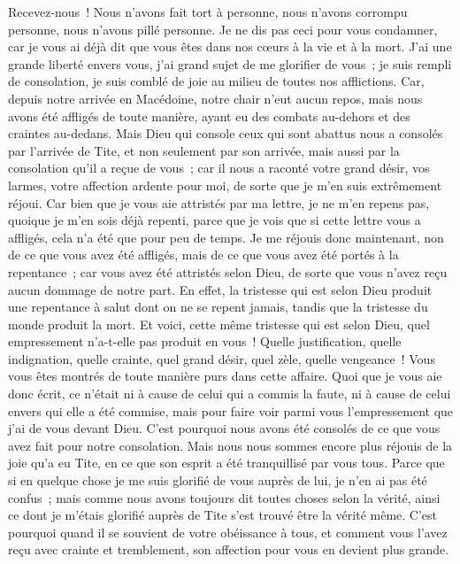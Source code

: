 \begin{multicols}{2}
Recevez-nous~! Nous n'avons fait tort à personne, nous n'avons corrompu personne, nous n'avons pillé personne.
Je ne dis pas ceci pour vous condamner, car je vous ai déjà dit que vous êtes dans nos cœurs à la vie et à la mort.
J'ai une grande liberté envers vous, j'ai grand sujet de me glorifier de vous~; je suis rempli de consolation, je suis comblé de joie au milieu de toutes nos afflictions.
Car, depuis notre arrivée en Macédoine, notre chair n'eut aucun repos, mais nous avons été affligés de toute manière, ayant eu des combats au-dehors et des craintes au-dedans.
Mais Dieu qui console ceux qui sont abattus nous a consolés par l'arrivée de Tite,
et non seulement par son arrivée, mais aussi par la consolation qu'il a reçue de vous~; car il nous a raconté votre grand désir, vos larmes, votre affection ardente pour moi, de sorte que je m'en suis extrêmement réjoui.
Car bien que je vous aie attristés par ma lettre, je ne m'en repens pas, quoique je m'en sois déjà repenti, parce que je vois que si cette lettre vous a affligés, cela n'a été que pour peu de temps.
Je me réjouis donc maintenant, non de ce que vous avez été affligés, mais de ce que vous avez été portés à la repentance~; car vous avez été attristés selon Dieu, de sorte que vous n'avez reçu aucun dommage de notre part.
En effet, la tristesse qui est selon Dieu produit une repentance à salut dont on ne se repent jamais, tandis que la tristesse du monde produit la mort.
Et voici, cette même tristesse qui est selon Dieu, quel empressement n'a-t-elle pas produit en vous~! Quelle justification, quelle indignation, quelle crainte, quel grand désir, quel zèle, quelle vengeance~! Vous vous êtes montrés de toute manière purs dans cette affaire.
Quoi que je vous aie donc écrit, ce n'était ni à cause de celui qui a commis la faute, ni à cause de celui envers qui elle a été commise, mais pour faire voir parmi vous l'empressement que j'ai de vous devant Dieu.
C'est pourquoi nous avons été consolés de ce que vous avez fait pour notre consolation. Mais nous nous sommes encore plus réjouis de la joie qu'a eu Tite, en ce que son esprit a été tranquillisé par vous tous.
Parce que si en quelque chose je me suis glorifié de vous auprès de lui, je n'en ai pas été confus~; mais comme nous avons toujours dit toutes choses selon la vérité, ainsi ce dont je m'étais glorifié auprès de Tite s'est trouvé être la vérité même.
C'est pourquoi quand il se souvient de votre obéissance à tous, et comment vous l'avez reçu avec crainte et tremblement, son affection pour vous en devient plus grande.

\end{multicols}
